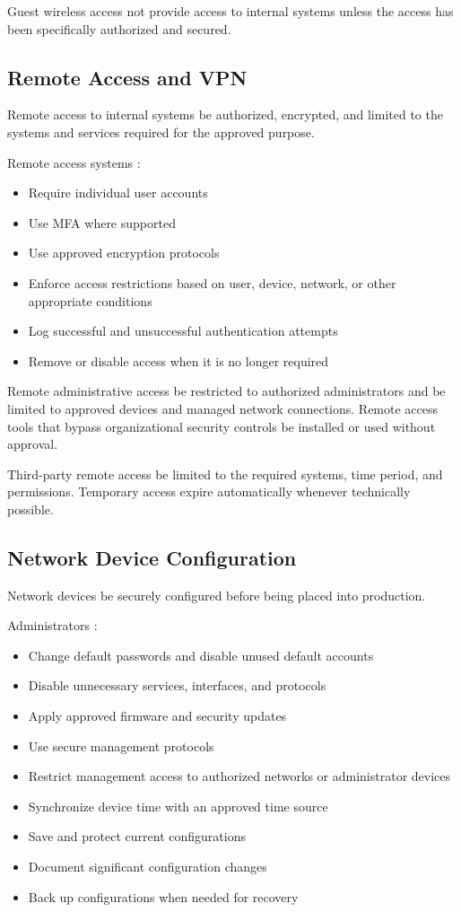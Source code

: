 Guest wireless access \must{} not provide access to internal systems unless the access has been specifically authorized and secured.

\subsection{Remote Access and VPN}

Remote access to internal systems \must{} be authorized, encrypted, and limited to the systems and services required for the approved purpose.

Remote access systems \must{}:
\begin{itemize}
    \item Require individual user accounts
    \item Use MFA where supported
    \item Use approved encryption protocols
    \item Enforce access restrictions based on user, device, network, or other appropriate conditions
    \item Log successful and unsuccessful authentication attempts
    \item Remove or disable access when it is no longer required
\end{itemize}

Remote administrative access \must{} be restricted to authorized administrators and \should{} be limited to approved devices and managed network connections. Remote access tools that bypass organizational security controls \mustnot{} be installed or used without approval.

Third-party remote access \must{} be limited to the required systems, time period, and permissions. Temporary access \should{} expire automatically whenever technically possible.

\subsection{Network Device Configuration}

Network devices \must{} be securely configured before being placed into production.

Administrators \must{}:
\begin{itemize}
    \item Change default passwords and disable unused default accounts
    \item Disable unnecessary services, interfaces, and protocols
    \item Apply approved firmware and security updates
    \item Use secure management protocols
    \item Restrict management access to authorized networks or administrator devices
    \item Synchronize device time with an approved time source
    \item Save and protect current configurations
    \item Document significant configuration changes
    \item Back up configurations when needed for recovery
\end{itemize}

